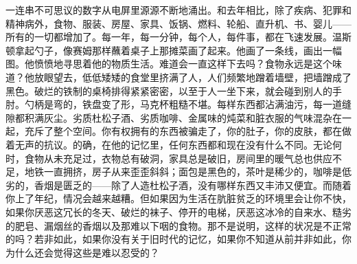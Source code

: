 \begin{paracol}{2}
\switchcolumn

一连串不可思议的数字从电屏里源源不断地涌出。和去年相比，除了疾病、犯罪和精神病外，食物、服装、房屋、家具、饭锅、燃料、轮船、直升机、书、婴儿——所有的一切都增加了。每一年，每一分钟，每个人，每件事，都在飞速发展。温斯顿拿起勺子，像赛姆那样蘸着桌子上那摊菜画了起来。他画了一条线，画出一幅图。他愤愤地寻思着他的物质生活。难道会一直这样下去吗？食物永远是这个味道？他放眼望去，低低矮矮的食堂里挤满了人，人们频繁地蹭着墙壁，把墙蹭成了黑色。破烂的铁制的桌椅排得紧紧密密，以至于人一坐下来，就会碰到别人的手肘。勺柄是弯的，铁盘变了形，马克杯粗糙不堪。每样东西都沾满油污，每一道缝隙都积满灰尘。劣质杜松子酒、劣质咖啡、金属味的炖菜和脏衣服的气味混杂在一起，充斥了整个空间。你有权拥有的东西被骗走了，你的肚子，你的皮肤，都在做着无声的抗议。的确，在他的记忆里，任何东西都和现在没有什么不同。无论何时，食物从未充足过，衣物总有破洞，家具总是破旧，房间里的暖气总也供应不足，地铁一直拥挤，房子从来歪歪斜斜；面包是黑色的，茶叶是稀少的，咖啡是低劣的，香烟是匮乏的——除了人造杜松子酒，没有哪样东西又丰沛又便宜。而随着你上了年纪，情况会越来越糟。但如果因为生活在肮脏贫乏的环境里会让你不快，如果你厌恶这冗长的冬天、破烂的袜子、停开的电梯，厌恶这冰冷的自来水、糙劣的肥皂、漏烟丝的香烟以及那难以下咽的食物。那不是说明，这样的状况是不正常的吗？若非如此，如果你没有关于旧时代的记忆，如果你不知道从前并非如此，你为什么还会觉得这些是难以忍受的？

\switchcolumn*


\end{paracol}
